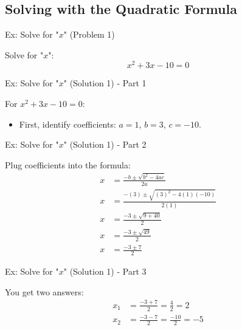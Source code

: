 \documentclass[aspectratio=169]{beamer}
\begin{document}
\subsection{Solving with the Quadratic Formula}

\begin{frame}{Ex: Solve for "$x$" (Problem 1)}
    \begin{tcolorbox}[colback=lightgray,colframe=primary,title=Problem 1]
        \footnotesize
        Solve for "$x$":
        \[ x^2 + 3x - 10 = 0 \]
    \end{tcolorbox}
\end{frame}

\begin{frame}{Ex: Solve for "$x$" (Solution 1) - Part 1}
    \begin{tcolorbox}[colback=lightgray,colframe=accent,title=Solution 1: Identify Coefficients]
        \footnotesize
        For $x^2 + 3x - 10 = 0$:
        \begin{itemize}
            \item First, identify coefficients: $a=1$, $b=3$, $c=-10$.
        \end{itemize}
    \end{tcolorbox}
\end{frame}

\begin{frame}{Ex: Solve for "$x$" (Solution 1) - Part 2}
    \begin{tcolorbox}[colback=lightgray,colframe=accent,title=Solution 1: Plug into Formula]
        \footnotesize
        Plug coefficients into the formula:
        \begin{align*}
            x &= \frac{-b \pm \sqrt{b^2 - 4ac}}{2a} \\
            x &= \frac{-(3) \pm \sqrt{(3)^2 - 4(1)(-10)}}{2(1)} \\
            x &= \frac{-3 \pm \sqrt{9 + 40}}{2} \\
            x &= \frac{-3 \pm \sqrt{49}}{2} \\
            x &= \frac{-3 \pm 7}{2}
        \end{align*}
    \end{tcolorbox}
\end{frame}

\begin{frame}{Ex: Solve for "$x$" (Solution 1) - Part 3}
    \begin{tcolorbox}[colback=lightgray,colframe=accent,title=Solution 1: Final Answers]
        \footnotesize
        You get two answers:
        \begin{align*}
            x_1 &= \frac{-3 + 7}{2} = \frac{4}{2} = 2 \\
            x_2 &= \frac{-3 - 7}{2} = \frac{-10}{2} = -5
        \end{align*}
    \end{tcolorbox}
\end{frame}
\end{document}
